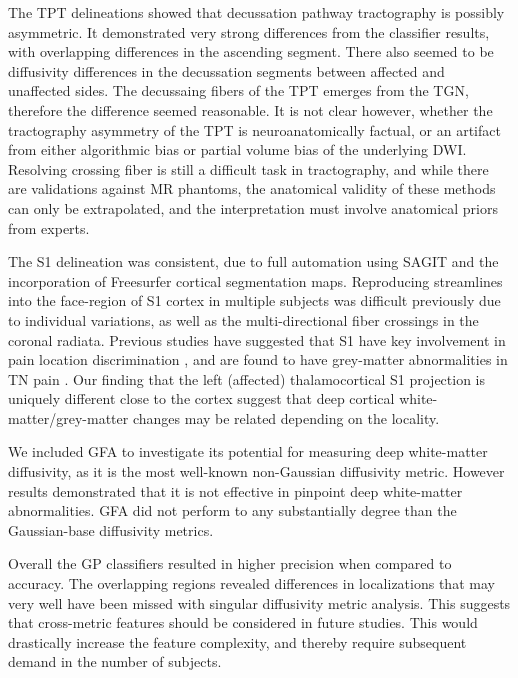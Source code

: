 The TPT delineations showed that decussation pathway tractography is possibly asymmetric. It demonstrated very strong differences from the classifier results, with overlapping differences in the ascending segment. There also seemed to be diffusivity differences in the decussation segments between affected and unaffected sides. The decussaing fibers of the TPT emerges from the TGN, therefore the difference seemed reasonable. It is not clear however, whether the tractography asymmetry of the TPT is neuroanatomically factual, or an artifact from either algorithmic bias or partial volume bias of the underlying DWI. Resolving crossing fiber is still a difficult task in tractography, and while there are validations against MR phantoms, the anatomical validity of these methods can only be extrapolated, and the interpretation must involve anatomical priors from experts.  

The S1 delineation was consistent, due to full automation using SAGIT and the incorporation of Freesurfer cortical segmentation maps. Reproducing streamlines into the face-region of S1 cortex in multiple subjects was difficult previously due to individual variations, as well as the multi-directional fiber crossings in the coronal radiata. Previous studies have suggested that S1 have key involvement in pain location discrimination \cite{bushnell1999pain}, and are found to have grey-matter abnormalities in TN pain \cite{Desouza2013c}. Our finding that the left (affected) thalamocortical S1 projection is uniquely different close to the cortex suggest that deep cortical white-matter/grey-matter changes may be related depending on the locality. 

We included GFA to investigate its potential for measuring deep white-matter diffusivity, as it is the most well-known non-Gaussian diffusivity metric. However results demonstrated that it is not effective in pinpoint deep white-matter abnormalities. GFA did not perform to any substantially degree than the Gaussian-base diffusivity metrics. 

Overall the GP classifiers resulted in higher precision when compared to accuracy. The overlapping regions revealed differences in localizations that may very well have been missed with singular diffusivity metric analysis. This suggests that cross-metric features should be considered in future studies. This would drastically increase the feature complexity, and thereby require subsequent demand in the number of subjects. 

